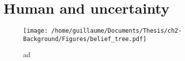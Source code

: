  \cite{Macro_uncertainty_2011}


\section{Human and uncertainty}






% 
%
%	
%
%
%



\begin{figure}[h]
 \centering
 \texttt{[image: /home/guillaume/Documents/Thesis/ch2-Background/Figures/belief\_tree.pdf]}
  \caption{ad}
\end{figure}

